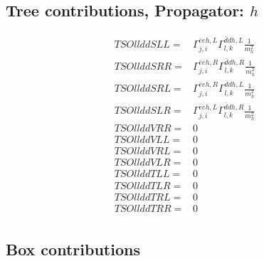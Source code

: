 \documentclass[A4,landscape]{article}
\begin{document}
\subsection{Tree contributions, Propagator: $h$} 

\begin{align} 
  TSOllddSLL= & \Gamma^{\bar{e}e h ,L}_{j, i} \Gamma^{\bar{d}d h ,L}_{l, k} \frac{1}{m^2_{h}} \\ 
  TSOllddSRR= & \Gamma^{\bar{e}e h ,R}_{j, i} \Gamma^{\bar{d}d h ,R}_{l, k} \frac{1}{m^2_{h}} \\ 
  TSOllddSRL= & \Gamma^{\bar{e}e h ,R}_{j, i} \Gamma^{\bar{d}d h ,L}_{l, k} \frac{1}{m^2_{h}} \\ 
  TSOllddSLR= & \Gamma^{\bar{e}e h ,L}_{j, i} \Gamma^{\bar{d}d h ,R}_{l, k} \frac{1}{m^2_{h}} \\ 
  TSOllddVRR= & 0 \\ 
  TSOllddVLL= & 0 \\ 
  TSOllddVRL= & 0 \\ 
  TSOllddVLR= & 0 \\ 
  TSOllddTLL= & 0 \\ 
  TSOllddTLR= & 0 \\ 
  TSOllddTRL= & 0 \\ 
  TSOllddTRR= & 0 \\ 
\end{align} 
\subsection{Box contributions} 
\end{document}
